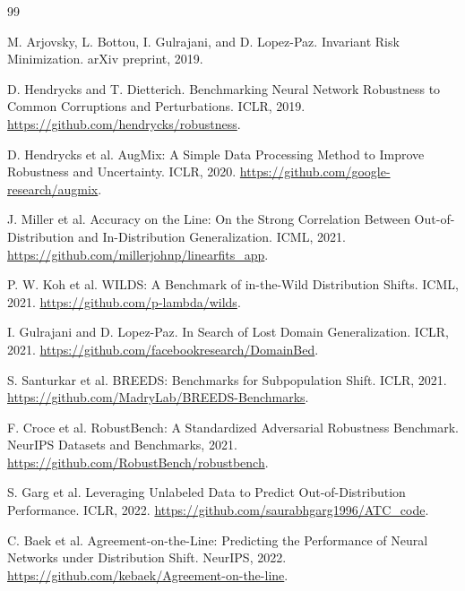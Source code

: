 \documentclass[11pt,a4paper]{article}
\begin{document}
\begin{thebibliography}{99}

M. Arjovsky, L. Bottou, I. Gulrajani, and D. Lopez-Paz.
\newblock Invariant Risk Minimization.
\newblock arXiv preprint, 2019.

D. Hendrycks and T. Dietterich.
\newblock Benchmarking Neural Network Robustness to Common Corruptions and Perturbations.
\newblock ICLR, 2019.
\newblock \url{https://github.com/hendrycks/robustness}.

D. Hendrycks et al.
\newblock AugMix: A Simple Data Processing Method to Improve Robustness and Uncertainty.
\newblock ICLR, 2020.
\newblock \url{https://github.com/google-research/augmix}.

J. Miller et al.
\newblock Accuracy on the Line: On the Strong Correlation Between Out-of-Distribution and In-Distribution Generalization.
\newblock ICML, 2021.
\newblock \url{https://github.com/millerjohnp/linearfits_app}.

P. W. Koh et al.
\newblock WILDS: A Benchmark of in-the-Wild Distribution Shifts.
\newblock ICML, 2021.
\newblock \url{https://github.com/p-lambda/wilds}.

I. Gulrajani and D. Lopez-Paz.
\newblock In Search of Lost Domain Generalization.
\newblock ICLR, 2021.
\newblock \url{https://github.com/facebookresearch/DomainBed}.

S. Santurkar et al.
\newblock BREEDS: Benchmarks for Subpopulation Shift.
\newblock ICLR, 2021.
\newblock \url{https://github.com/MadryLab/BREEDS-Benchmarks}.

F. Croce et al.
\newblock RobustBench: A Standardized Adversarial Robustness Benchmark.
\newblock NeurIPS Datasets and Benchmarks, 2021.
\newblock \url{https://github.com/RobustBench/robustbench}.

S. Garg et al.
\newblock Leveraging Unlabeled Data to Predict Out-of-Distribution Performance.
\newblock ICLR, 2022.
\newblock \url{https://github.com/saurabhgarg1996/ATC_code}.

C. Baek et al.
\newblock Agreement-on-the-Line: Predicting the Performance of Neural Networks under Distribution Shift.
\newblock NeurIPS, 2022.
\newblock \url{https://github.com/kebaek/Agreement-on-the-line}.


\end{thebibliography}
\end{document}
